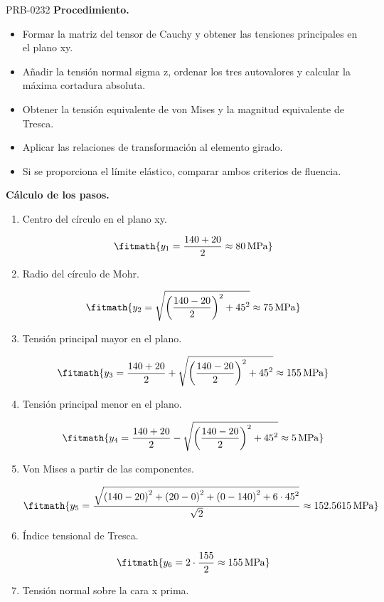 \begin{studiumworked}{PRB-0232}
\textbf{Procedimiento.}\begin{itemize}\item Formar la matriz del tensor de Cauchy y obtener las tensiones principales en el plano xy.
\item Añadir la tensión normal sigma z, ordenar los tres autovalores y calcular la máxima cortadura absoluta.
\item Obtener la tensión equivalente de von Mises y la magnitud equivalente de Tresca.
\item Aplicar las relaciones de transformación al elemento girado.
\item Si se proporciona el límite elástico, comparar ambos criterios de fluencia.\end{itemize}

\textbf{Cálculo de los pasos.}

\begin{enumerate}

\item Centro del círculo en el plano xy.

\[\fitmath{y_{1}=\frac{140+20}{2}\approx 80\,\mathrm{MPa}}\]

\item Radio del círculo de Mohr.

\[\fitmath{y_{2}=\sqrt{{\left(\frac{140-20}{2}\right)}^{2}+{45}^{2}}\approx 75\,\mathrm{MPa}}\]

\item Tensión principal mayor en el plano.

\[\fitmath{y_{3}=\frac{140+20}{2}+\sqrt{{\left(\frac{140-20}{2}\right)}^{2}+{45}^{2}}\approx 155\,\mathrm{MPa}}\]

\item Tensión principal menor en el plano.

\[\fitmath{y_{4}=\frac{140+20}{2}-\sqrt{{\left(\frac{140-20}{2}\right)}^{2}+{45}^{2}}\approx 5\,\mathrm{MPa}}\]

\item Von Mises a partir de las componentes.

\[\fitmath{y_{5}=\frac{\sqrt{{\left(140-20\right)}^{2}+{\left(20-0\right)}^{2}+{\left(0-140\right)}^{2}+6\cdot {45}^{2}}}{\sqrt{2}}\approx 152.5615\,\mathrm{MPa}}\]

\item Índice tensional de Tresca.

\[\fitmath{y_{6}=2\cdot \frac{155}{2}\approx 155\,\mathrm{MPa}}\]

\item Tensión normal sobre la cara x prima.


\end{enumerate}
\end{studiumworked}
